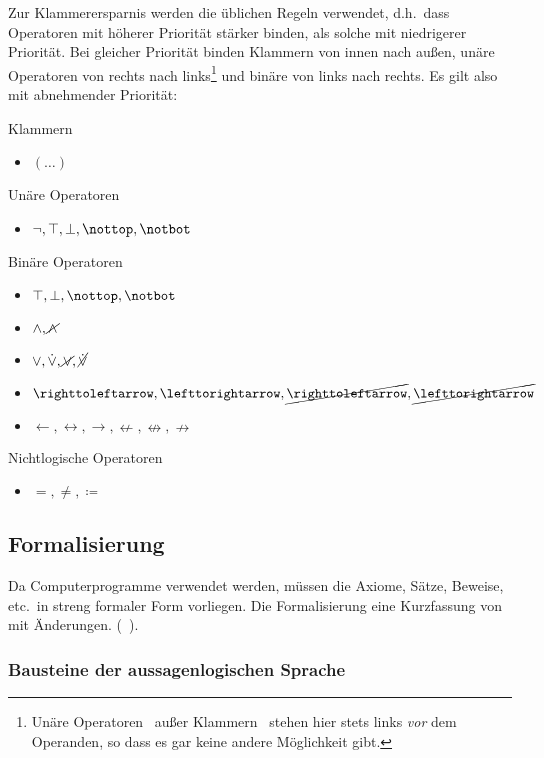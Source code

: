 \documentclass[english,ngerman,parskip=half,headsepline,footsepline]{scrreprt}
\makeatletter
\newcommand{\lutrue}{\operatorname{\top}}      %
\newcommand{\lnufalse}{\operatorname{\notbot}} %
\newcommand{\lufalse}{\operatorname{\bot}}     %
\newcommand{\lnutrue}{\operatorname{\nottop}}  %
\newcommand{\lbtrue}{\operatorname{\top}}              %
\newcommand{\lnbfalse}{\operatorname{\notbot}}         %
\newcommand{\lnxor}{\operatorname{\cancel{\lxor}}}     %
\newcommand{\lleftimp}{\operatorname{\leftarrow}}      %
\newcommand{\lleft}{\operatorname{\righttoleftarrow}}  %
\newcommand{\limp}{\operatorname{\rightarrow}}         %
\newcommand{\lright}{\operatorname{\lefttorightarrow}} %
\newcommand{\lequiv}{\operatorname{\leftrightarrow}}   %
\newcommand{\lnand}{\operatorname{\cancel{\land}}}     %
\newcommand{\lnequiv}{\operatorname{\nleftrightarrow}} %
\newcommand{\lxor}{\operatorname{\dot{\lor}}}          %
\newcommand{\lnright}{\operatorname{\cancel{\lright}}} %
\newcommand{\lnimp}{\operatorname{\nrightarrow}}       %
\newcommand{\lnleft}{\operatorname{\cancel{\lleft}}}   %
\newcommand{\lnleftimp}{\operatorname{\nleftarrow}}    %
\newcommand{\lnor}{\operatorname{\cancel{\lor}}}       %
\newcommand{\lbfalse}{\operatorname{\bot}}             %
\newcommand{\lnbtrue}{\operatorname{\nottop}    }      %
\newcommand{\defeq}{\coloneqq}
\newcommand{\textdh}{d.\@ h.\@}
\newcommand{\textetc}{etc.\@}
\makeatother
\begin{document}
	Zur Klammerersparnis werden die üblichen Regeln verwendet, \textdh\ dass Operatoren mit höherer Priorität stärker binden, als solche mit niedrigerer Priorität. Bei gleicher Priorität binden Klammern von innen nach außen, unäre Operatoren von rechts nach links\footnote{ Unäre Operatoren \textendash\ außer Klammern \textendash\ stehen hier stets links \emph{vor} dem Operanden, so dass es gar keine andere Möglichkeit gibt.} und binäre von links nach rechts. Es gilt also mit abnehmender Priorität:

	Klammern
	\begin{itemize}
		\item $(\dots)$
	\end{itemize}
	Unäre Operatoren
	\begin{itemize}
		\item $\lnot, \lutrue, \lufalse, \lnutrue, \lnufalse$
	\end{itemize}
	Binäre Operatoren
	\begin{itemize}
		\item $\lbtrue, \lbfalse, \lnbtrue, \lnbfalse$
		\item $\land, \lnand$
		\item $\lor, \lxor, \lnor, \lnxor$
		\item $\lleft, \lright, \lnleft, \lnright$
		\item $\lleftimp, \lequiv, \limp, \lnleftimp, \lnequiv, \lnimp$
	\end{itemize}
	Nichtlogische Operatoren
	\begin{itemize}
		\item $=, \ne, \defeq$
	\end{itemize}

	\subsection{Formalisierung}
	\label{sub:Formalisierung}

	Da Computerprogramme verwendet werden, müssen die Axiome, Sätze, Beweise, \textetc\ in streng formaler Form vorliegen. Die Formalisierung eine Kurzfassung von~\cite{bib:Aussagenlogik} mit Änderungen. (\alsoname~\cite{bib:LogikDe, bib:LogikEn}).

	\begingroup
		\subsubsection{Bausteine der aussagenlogischen Sprache}
		\label{subsub:Bausteine}
\end{document}
